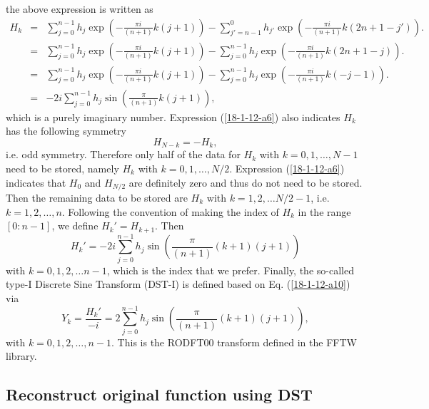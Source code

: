 \documentclass{article}
\begin{document}
the above expression is written as
\begin{eqnarray}
  H_k & = & \sum_{j = 0}^{n - 1} h_j \exp \left( - \frac{\pi i}{(n + 1)} k (j
  + 1) \right) - \sum_{j' = n - 1}^0 h_{j'} \exp \left( - \frac{\pi i}{(n +
  1)} k (2 n + 1 - j') \right) . \nonumber\\
  & = & \sum_{j = 0}^{n - 1} h_j \exp \left( - \frac{\pi i}{(n + 1)} k (j +
  1) \right) - \sum_{j = 0}^{n - 1} h_j \exp \left( - \frac{\pi i}{(n + 1)} k
  (2 n + 1 - j) \right) . \nonumber\\
  & = & \sum_{j = 0}^{n - 1} h_j \exp \left( - \frac{\pi i}{(n + 1)} k (j +
  1) \right) - \sum_{j = 0}^{n - 1} h_j \exp \left( - \frac{\pi i}{(n + 1)} k
  (- j - 1) \right) . \nonumber\\
  & = & - 2 i \sum_{j = 0}^{n - 1} h_j \sin \left( \frac{\pi}{(n + 1)} k (j +
  1) \right),  \label{18-1-12-a6}
\end{eqnarray}
which is a purely imaginary number. Expression (\ref{18-1-12-a6}) also
indicates $H_k$ has the following symmetry
\begin{equation}
  \label{18-1-12-a8} H_{N - k} = - H_k,
\end{equation}
i.e. odd symmetry. Therefore only half of the data for $H_k$ with $k = 0, 1,
\ldots, N - 1$ need to be stored, namely $H_k$ with $k = 0, 1, \ldots, N / 2$.
Expression (\ref{18-1-12-a6}) indicates that $H_0$ and $H_{N / 2}$ are
definitely zero and thus do not need to be stored. Then the remaining data to
be stored are $H_k$ with $k = 1, 2, \ldots N / 2 - 1$, i.e. $k = 1, 2, \ldots,
n$. Following the convention of making the index of $H_k$ in the range $[0 : n
- 1]$, we define $H_k' = H_{k + 1}$. Then
\begin{equation}
  \label{18-1-12-a10} H_k' = - 2 i \sum_{j = 0}^{n - 1} h_j \sin \left(
  \frac{\pi}{(n + 1)}  (k + 1)  (j + 1) \right)
\end{equation}
with $k = 0, 1, 2, \ldots n - 1$, which is the index that we prefer. Finally,
the so-called type-I Discrete Sine Transform (DST-I) is defined based on Eq.
(\ref{18-1-12-a10}) via
\begin{equation}
  Y_k = \frac{H_k'}{- i} = 2 \sum_{j = 0}^{n - 1} h_j \sin \left(
  \frac{\pi}{(n + 1)}  (k + 1)  (j + 1) \right),
\end{equation}
with $k = 0, 1, 2, \ldots, n - 1$. This is the RODFT00 transform defined in
the FFTW library.

\subsection{Reconstruct original function using DST}
\end{document}
